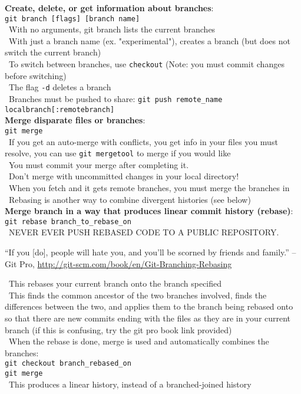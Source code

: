 \documentclass[12pt]{article}
\begin{document}
{{\bf Create, delete, or get information about branches}:\\
\texttt{git branch [flags] [branch name]}\\
\textbullet\, With no arguments, git branch lists the current branches\\
\textbullet\, With just a branch name (ex. "experimental"), creates a branch (but does not switch the current branch)\\
\textbullet\, To switch between branches, use \texttt{checkout} (Note: you must commit changes before switching)\\
\textbullet\, The flag \texttt{-d} deletes a branch\\
\textbullet\, Branches must be pushed to share: 
\texttt{git push remote{\_}name localbranch[:remotebranch]}\\ %

{\bf Merge disparate files or branches}:\\
\texttt{git merge}\\    
\textbullet\, If you get an auto-merge with conflicts, you get info in your files you must resolve, you can use \texttt{git mergetool} to merge if you would like\\
\textbullet\, You must commit your merge after completing it.\\
\textbullet\, Don't merge with uncommitted changes in your local directory!\\
\textbullet\, When you fetch and it gets remote branches, you must merge the branches in\\
\textbullet\, Rebasing is another way to combine divergent histories (see below)\\

{\bf Merge branch in a way that produces linear commit history (rebase)}:\\
\texttt{git rebase branch{\_}to{\_}rebase{\_}on}\\
\textbullet\, NEVER EVER PUSH REBASED CODE TO A PUBLIC REPOSITORY.
\begin{quoting}[vskip=0pt]
``If you [do], people will hate you, and you’ll be scorned by friends and family.'' --Git Pro, \url{http://git-scm.com/book/en/Git-Branching-Rebasing}
\end{quoting}
\textbullet\, This rebases your current branch onto the branch specified\\
\textbullet\, This finds the common ancestor of the two branches involved, finds the differences between the two, and applies them to the branch being rebased onto so that there are new commits ending with the files as they are in your current branch (if this is confusing, try the git pro book link provided)\\
\textbullet\, When the rebase is done, merge is used and automatically combines the branches:\\
    \texttt{git checkout branch{\_}rebased{\_}on}\\
    \texttt{git merge}\\
\textbullet\, This produces a linear history, instead of a branched-joined history\\
\vspace{5mm}

}
\end{document}

